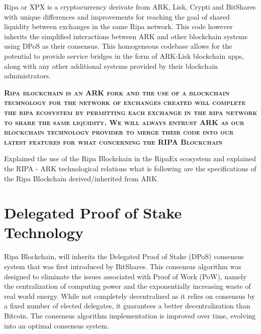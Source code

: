 \documentclass[11pt,fleqn,oneside]{book} %
\begin{document}
Ripa \PHP or XPX is a cryptocurrency derivate from ARK, Lisk, Crypti and BitShares with unique differences and improvements
for reaching the goal of shared liquidity between exchanges in the same Ripa network. This code however inherits the 
simplified interactions between ARK and other blockchain systems using DPoS as their consensus. This homogeneous codebase
allows for the potential to provide service bridges in the form of ARK-Lisk blockchain apps, along with any other additional 
systems provided by their blockchain administrators.

\vspace{5mm}
\textsc{\textbf{Ripa blockchain is an ARK fork and the use of a blockchain technology for the network of exchanges created will complete
the ripa ecosystem by permitting each exchange in the ripa network to share the same liquidity. We will always entrust ARK as our 
blockchain technology provider to merge their code into our latest features for what concerning the RIPA Blockchain}}

\vspace{5mm}

Explained the use of the Ripa Blockchain in the RipaEx ecosystem and explained the RIPA - ARK technological relations what is 
following are the specifications of the Ripa Blockchain derived/inherited from ARK.

\section{Delegated Proof of Stake Technology}
Ripa Blockchain, will inherits the Delegated Proof of Stake (DPoS) consensus system that was first introduced
by BitShares. This consensus algorithm was designed to eliminate the issues associated with Proof of Work (PoW), 
namely the centralization of computing power and the exponentially increasing waste of real world energy. While not
completely decentralized as it relies on consensus by a fixed number of elected delegates, it guarantees a better decentralization 
than Bitcoin. The consensus algorithm implementation is improved over time, evolving into an optimal consensus system.\\
\end{document}
